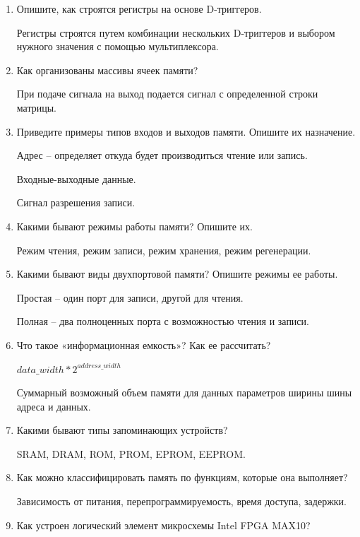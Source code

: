 \documentclass[a4paper,14pt]{article}
\begin{document}
	\begin{enumerate}
		\item Опишите, как строятся регистры на основе D-триггеров.
		
		Регистры строятся путем комбинации нескольких D-триггеров и выбором нужного значения с помощью мультиплексора.
		
		\item Как организованы массивы ячеек памяти?
		
		При подаче сигнала на выход подается сигнал с определенной строки матрицы.
		
		\item Приведите примеры типов входов и выходов памяти. Опишите их назначение.
		
		Адрес -- определяет откуда будет производиться чтение или запись.
		
		Входные-выходные данные.
		
		Сигнал разрешения записи.
		
		\item Какими бывают режимы работы памяти? Опишите их.
		
		Режим чтения, режим записи, режим хранения, режим регенерации.
		
		\item Какими бывают виды двухпортовой памяти? Опишите режимы ее работы.
		
		Простая -- один порт для записи, другой для чтения.
		
		Полная -- два полноценных порта с возможностью чтения и записи.
		
		\item Что такое «информационная емкость»? Как ее рассчитать?
		
		$ data\_width * 2 ^ {address\_width} $
		
		Суммарный возможный объем памяти для данных параметров ширины шины адреса и данных.
		
		\item Какими бывают типы запоминающих устройств?
		
		SRAM, DRAM, ROM, PROM, EPROM, EEPROM.
		
		\item Как можно классифицировать память по функциям, которые она выполняет?
		
		Зависимость от питания, перепрограммируемость, время доступа, задержки.
		
		\item Как устроен логический элемент микросхемы Intel FPGA MAX10?
		

\end{enumerate}
\end{document}
